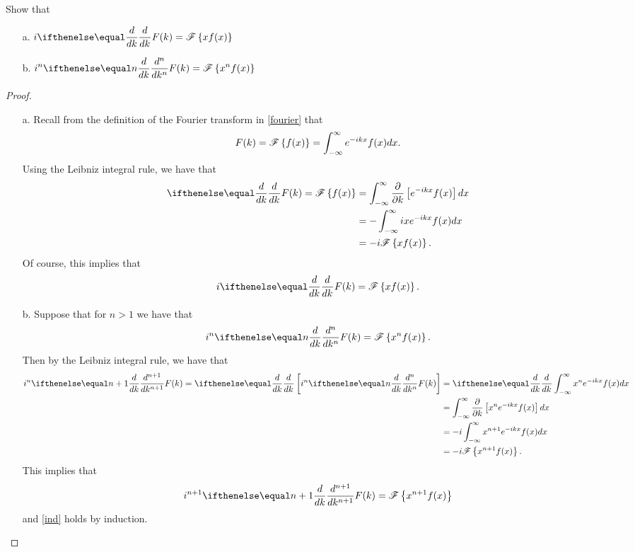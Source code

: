 \begin{problem}{2.3}
  Show that
  \begin{enumerate}
    \item [a.] $\displaystyle i \der{k}{} F(k) = \fourier{x f(x)}$
    \item [b.] $\displaystyle i^n \der{k}{n} F(k) = \fourier{x^n f(x)}$
  \end{enumerate}
\end{problem}

\begin{proof}
  \begin{enumerate}
    \item [a.] Recall from the definition of the Fourier transform in \eqref{fourier} that
      \begin{align*}
        F(k) = \mathscr{F}\left\{ {f(x)} \right\} = \int_{-\infty}^{\infty} e^{-ikx} f(x) dx.
      \end{align*}
      Using the Leibniz integral rule, we have that
      \begin{align*}
        \der{k}{}F(k) = \fourier{f(x)} &= \int_{-\infty}^{\infty} \frac{\partial }{\partial k}\left[e^{-ikx} f(x)\right] dx\\
        &= -\int_{-\infty}^{\infty} ix e^{-ikx} f(x)dx \\
        &= - i \fourier{x f(x)}.
      \end{align*}
      Of course, this implies that
      \begin{align*}
        i \der{k}{}F(k) = \fourier{x f(x)}.
      \end{align*}
    \item [b.] Suppose that for $n  > 1$ we have that
      \begin{align}\label{ind}
        i^n \der{k}{n} F(k) = \fourier{x^n f(x)}.
      \end{align}
      Then by the Leibniz integral rule, we have that
      \begin{align*}
        i^n \der{k}{n+1} F(k) = \der{k}{}\left[i^n \der{k}{n} F(k)\right] &= \der{k}{} \int_{-\infty}^{\infty} x^n e^{-ikx} f(x) dx\\
        &= \int_{-\infty}^{\infty} \frac{\partial }{\partial k}\left[x^ne^{-ikx} f(x)\right] dx\\
        &= -i\int_{-\infty}^{\infty} x^{n+1} e^{-ikx} f(x)dx \\
        &= -i \fourier{x^{n+1}f(x)}.
      \end{align*}
      This implies that
      \begin{align*}
        i^{n+1} \der{k}{n+1} F(k) = \fourier{x^{n+1} f(x)}
      \end{align*}
      and \eqref{ind} holds by induction.
  \end{enumerate}
\end{proof}
\newpage
